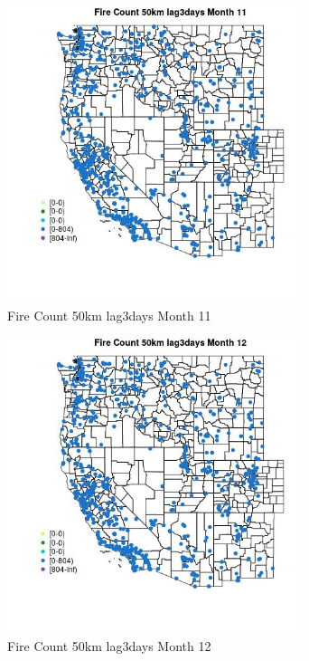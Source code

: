 \begin{figure} 
\centering  
\includegraphics[width=0.77\textwidth]{Code_Outputs/Report_ML_input_PM25_Step4_part_f_de_duplicated_aveswNAs_MapObsMo11Fire_Count_50km_lag3days.jpg} 
\caption{\label{fig:Report_ML_input_PM25_Step4_part_f_de_duplicated_aveswNAsMapObsMo11Fire_Count_50km_lag3days}Fire Count 50km lag3days Month 11} 
\end{figure} 
 

\clearpage 

\begin{figure} 
\centering  
\includegraphics[width=0.77\textwidth]{Code_Outputs/Report_ML_input_PM25_Step4_part_f_de_duplicated_aveswNAs_MapObsMo12Fire_Count_50km_lag3days.jpg} 
\caption{\label{fig:Report_ML_input_PM25_Step4_part_f_de_duplicated_aveswNAsMapObsMo12Fire_Count_50km_lag3days}Fire Count 50km lag3days Month 12} 
\end{figure} 
 

